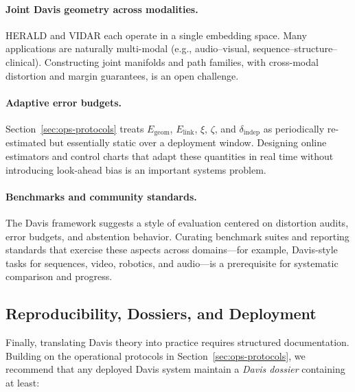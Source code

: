 \documentclass[11pt]{article}
\theoremstyle{remark}
\theoremstyle{plain}
\begin{document}
\paragraph{Joint Davis geometry across modalities.}
HERALD and VIDAR each operate in a single embedding space. Many applications are naturally
multi-modal (e.g., audio--visual, sequence--structure--clinical). Constructing joint manifolds and
path families, with cross-modal distortion and margin guarantees, is an open challenge.

\paragraph{Adaptive error budgets.}\label{sec:error-budgets}
Section~\ref{sec:ops-protocols} treats $E_{\mathrm{geom}}$, $E_{\mathrm{link}}$, $\xi$, $\zeta$, and
$\delta_{\mathrm{indep}}$ as periodically re-estimated but essentially static over a deployment window.
Designing online estimators and control charts that adapt these quantities in real time without
introducing look-ahead bias is an important systems problem.

\paragraph{Benchmarks and community standards.}
The Davis framework suggests a style of evaluation centered on distortion audits, error budgets,
and abstention behavior. Curating benchmark suites and reporting standards that exercise these
aspects across domains---for example, Davis-style tasks for sequences, video, robotics, and audio---is
a prerequisite for systematic comparison and progress.

\subsection{Reproducibility, Dossiers, and Deployment}

Finally, translating Davis theory into practice requires structured documentation. Building on the
operational protocols in Section~\ref{sec:ops-protocols}, we recommend that any deployed Davis
system maintain a \emph{Davis dossier} containing at least:
\end{document}
